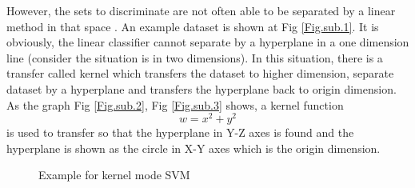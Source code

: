\documentclass[a4paper,12pt]{article}
\begin{document}
However, the sets to discriminate are not often able to be separated by a linear method in that space \autocite{wiki:svm}. An example dataset is shown at Fig \ref{Fig.sub.1}. It is obviously, the linear classifier cannot separate by a hyperplane in a one dimension line (consider the situation is in two dimensions). In this situation, there is a transfer called kernel which transfers the dataset to higher dimension, separate dataset by a hyperplane and transfers the hyperplane back to origin dimension. As the graph Fig \ref{Fig.sub.2}, Fig \ref{Fig.sub.3} shows, a kernel function \[w = x^2 + y ^2\] is used to transfer so that the hyperplane in Y-Z axes is found and the hyperplane is shown as the circle in X-Y axes which is the origin dimension.

\begin{figure}[H]
\centering 
{}
\caption{Example for kernel mode SVM \autocite{patel_2019}}
\label{Fig.main}
\end{figure}
\end{document}
